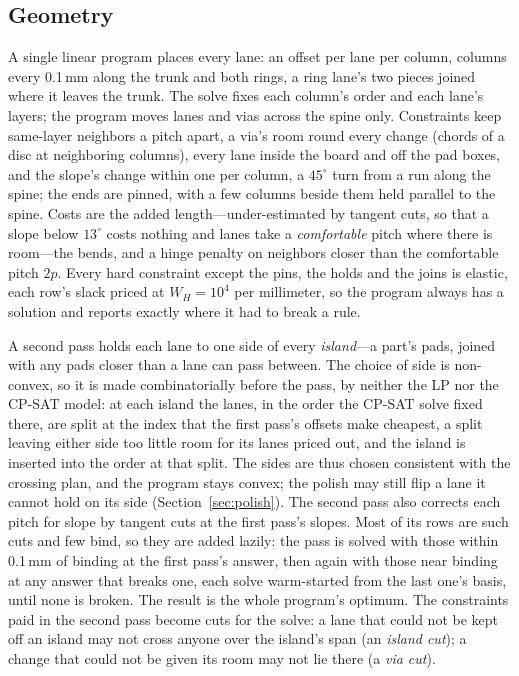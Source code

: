 \documentclass[journal]{IEEEtran}
\begin{document}
\subsection{Geometry}
\label{sec:geometry}
A single linear program places every lane: an offset per lane per column, columns every 0.1\,mm along the trunk and both rings, a ring lane's two pieces joined where it leaves the trunk. The solve fixes each column's order and each lane's layers; the program moves lanes and vias across the spine only. Constraints keep same-layer neighbors a pitch apart, a via's room round every change (chords of a disc at neighboring columns), every lane inside the board and off the pad boxes, and the slope's change within one per column, a $45^\circ$ turn from a run along the spine; the ends are pinned, with a few columns beside them held parallel to the spine. Costs are the added length---under-estimated by tangent cuts, so that a slope below $13^\circ$ costs nothing and lanes take a \emph{comfortable} pitch where there is room---the bends, and a hinge penalty on neighbors closer than the comfortable pitch $2p$. Every hard constraint except the pins, the holds and the joins is elastic, each row's slack priced at $W_H=10^4$ per millimeter, so the program always has a solution and reports exactly where it had to break a rule.

A second pass holds each lane to one side of every \emph{island}---a part's pads, joined with any pads closer than a lane can pass between. The choice of side is non-convex, so it is made combinatorially before the pass, by neither the LP nor the CP-SAT model: at each island the lanes, in the order the CP-SAT solve fixed there, are split at the index that the first pass's offsets make cheapest, a split leaving either side too little room for its lanes priced out, and the island is inserted into the order at that split. The sides are thus chosen consistent with the crossing plan, and the program stays convex; the polish may still flip a lane it cannot hold on its side (Section~\ref{sec:polish}). The second pass also corrects each pitch for slope by tangent cuts at the first pass's slopes. Most of its rows are such cuts and few bind, so they are added lazily: the pass is solved with those within 0.1\,mm of binding at the first pass's answer, then again with those near binding at any answer that breaks one, each solve warm-started from the last one's basis, until none is broken. The result is the whole program's optimum. The constraints paid in the second pass become cuts for the solve: a lane that could not be kept off an island may not cross anyone over the island's span (an \emph{island cut}); a change that could not be given its room may not lie there (a \emph{via cut}).
\end{document}
